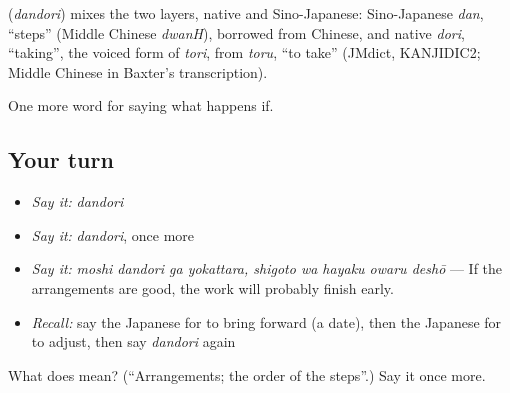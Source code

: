 \begin{cousinweb}
\textbf{} (\emph{dandori}) mixes the two layers, native and Sino-Japanese: Sino-Japanese \emph{dan}, \textquotedblleft{}steps\textquotedblright{} (Middle Chinese \emph{dwanH}), borrowed from Chinese, and native \emph{dori}, \textquotedblleft{}taking\textquotedblright{}, the voiced form of \emph{tori}, from \emph{toru}, \textquotedblleft{}to take\textquotedblright{} (JMdict, KANJIDIC2; Middle Chinese in Baxter's transcription).
\end{cousinweb}

\begin{grammarlens}[title={What you've built}]
One more word for saying what happens if.
\end{grammarlens}

\subsection*{Your turn}
\begin{itemize}
\raggedright
  \item \emph{Say it:} \emph{dandori}
  \item \emph{Say it:} \emph{dandori}, once more
  \item \emph{Say it:} \emph{moshi dandori ga yokattara, shigoto wa hayaku owaru deshō} — If the arrangements are good, the work will probably finish early.
  \item \emph{Recall:} say the Japanese for to bring forward (a date), then the Japanese for to adjust, then say \emph{dandori} again
\end{itemize}

\begin{tcolorbox}[breakable,colback=teal!4,colframe=teal!35!black,title={Before you move on}]
What does  mean? (\textquotedblleft{}Arrangements; the order of the steps\textquotedblright{}.) Say it once more.
\end{tcolorbox}
